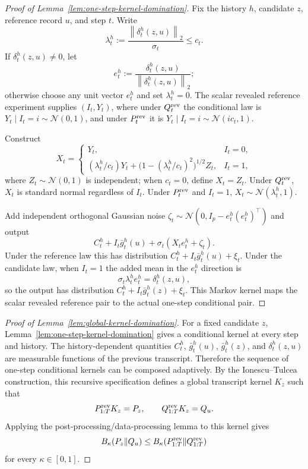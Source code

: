 \documentclass[11pt,a4paper]{report}
\theoremstyle{plain}
\theoremstyle{definition}
\theoremstyle{remark}
\newcommand{\N}{\mathcal{N}}
\newcommand{\norm}[1]{\left\lVert #1\right\rVert}
\begin{document}
\begin{proof}[Proof of Lemma~\ref{lem:one-step-kernel-domination}]
Fix the history $h$, candidate $z$, reference record $u$, and step $t$.  Write
\[
\lambda_t^h:=\frac{\norm{\delta_t^h(z,u)}_2}{\sigma_t}\le c_t.
\]
If $\delta_t^h(z,u)\ne0$, let
\[
e_t^h:=\frac{\delta_t^h(z,u)}{\norm{\delta_t^h(z,u)}_2};
\]
otherwise choose any unit vector $e_t^h$ and set $\lambda_t^h=0$.  The scalar revealed reference experiment supplies $(I_t,Y_t)$, where under $Q_t^{\rm rev}$ the conditional law is $Y_t\mid I_t=i\sim\N(0,1)$, and under $P_t^{\rm rev}$ it is $Y_t\mid I_t=i\sim\N(ic_t,1)$.

Construct
\[
X_t=
\begin{cases}
Y_t, & I_t=0,\\
(\lambda_t^h/c_t)Y_t+\bigl(1-(\lambda_t^h/c_t)^2\bigr)^{1/2}Z_t, & I_t=1,
\end{cases}
\]
where $Z_t\sim\N(0,1)$ is independent; when $c_t=0$, define $X_t=Z_t$.  Under $Q_t^{\rm rev}$, $X_t$ is standard normal regardless of $I_t$.  Under $P_t^{\rm rev}$ and $I_t=1$, $X_t\sim\N(\lambda_t^h,1)$.

Add independent orthogonal Gaussian noise $\zeta_t\sim\N(0,I_p-e_t^h(e_t^h)^\top)$ and output
\[
C_t^h+I_t\bar g_t^h(u)+\sigma_t(X_te_t^h+\zeta_t).
\]
Under the reference law this has distribution $C_t^h+I_t\bar g_t^h(u)+\xi_t$.  Under the candidate law, when $I_t=1$ the added mean in the $e_t^h$ direction is
\[
\sigma_t\lambda_t^h e_t^h=\delta_t^h(z,u),
\]
so the output has distribution $C_t^h+I_t\bar g_t^h(z)+\xi_t$.  This Markov kernel maps the scalar revealed reference pair to the actual one-step conditional pair.
\end{proof}

\begin{proof}[Proof of Lemma~\ref{lem:global-kernel-domination}]
For a fixed candidate $z$, Lemma~\ref{lem:one-step-kernel-domination} gives a conditional kernel at every step and history.  The history-dependent quantities $C_t^h$, $\bar g_t^h(u)$, $\bar g_t^h(z)$, and $\delta_t^h(z,u)$ are measurable functions of the previous transcript.  Therefore the sequence of one-step conditional kernels can be composed adaptively.  By the Ionescu--Tulcea construction, this recursive specification defines a global transcript kernel $K_z$ such that
\[
P_{1:T}^{\rm rev}K_z=P_z,
\qquad
Q_{1:T}^{\rm rev}K_z=Q_u.
\]
Applying the post-processing/data-processing lemma to this kernel gives
\[
B_\kappa(P_z\|Q_u)
\le
B_\kappa(P_{1:T}^{\rm rev}\|Q_{1:T}^{\rm rev})
\]
for every $\kappa\in[0,1]$.
\end{proof}
\end{document}

